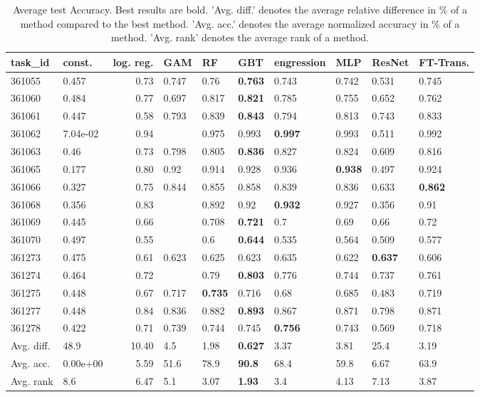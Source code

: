 \begin{table}[ht!]
\centering
\begingroup\footnotesize
\begin{tabular}{llrlllllll}
  \hline
\hline
task\_id & const. & log. reg. & GAM & RF & GBT & engression & MLP & ResNet & FT-Trans. \\ 
  \hline
361055 & 0.457 & 0.73 & 0.747 & 0.76 & \textbf{0.763} & 0.743 & 0.742 & 0.531 & 0.745 \\ 
  361060 & 0.484 & 0.77 & 0.697 & 0.817 & \textbf{0.821} & 0.785 & 0.755 & 0.652 & 0.762 \\ 
  361061 & 0.447 & 0.58 & 0.793 & 0.839 & \textbf{0.843} & 0.794 & 0.813 & 0.743 & 0.833 \\ 
  361062 & 7.04e-02 & 0.94 &  & 0.975 & 0.993 & \textbf{0.997} & 0.993 & 0.511 & 0.992 \\ 
  361063 & 0.46 & 0.73 & 0.798 & 0.805 & \textbf{0.836} & 0.827 & 0.824 & 0.609 & 0.816 \\ 
  361065 & 0.177 & 0.80 & 0.92 & 0.914 & 0.928 & 0.936 & \textbf{0.938} & 0.497 & 0.924 \\ 
  361066 & 0.327 & 0.75 & 0.844 & 0.855 & 0.858 & 0.839 & 0.836 & 0.633 & \textbf{0.862} \\ 
  361068 & 0.356 & 0.83 &  & 0.892 & 0.92 & \textbf{0.932} & 0.927 & 0.356 & 0.91 \\ 
  361069 & 0.445 & 0.66 &  & 0.708 & \textbf{0.721} & 0.7 & 0.69 & 0.66 & 0.72 \\ 
  361070 & 0.497 & 0.55 &  & 0.6 & \textbf{0.644} & 0.535 & 0.564 & 0.509 & 0.577 \\ 
  361273 & 0.475 & 0.61 & 0.623 & 0.625 & 0.623 & 0.635 & 0.622 & \textbf{0.637} & 0.606 \\ 
  361274 & 0.464 & 0.72 &  & 0.79 & \textbf{0.803} & 0.776 & 0.744 & 0.737 & 0.761 \\ 
  361275 & 0.448 & 0.67 & 0.717 & \textbf{0.735} & 0.716 & 0.68 & 0.685 & 0.483 & 0.719 \\ 
  361277 & 0.448 & 0.84 & 0.836 & 0.882 & \textbf{0.893} & 0.867 & 0.871 & 0.798 & 0.871 \\ 
  361278 & 0.422 & 0.71 & 0.739 & 0.744 & 0.745 & \textbf{0.756} & 0.743 & 0.569 & 0.718 \\ 
   \hline
Avg. diff. & 48.9 & 10.40 & 4.5 & 1.98 & \textbf{0.627} & 3.37 & 3.81 & 25.4 & 3.19 \\ 
  Avg. acc. & 0.00e+00 & 5.59 & 51.6 & 78.9 & \textbf{90.8} & 68.4 & 59.8 & 6.67 & 63.9 \\ 
  Avg. rank & 8.6 & 6.47 & 5.1 & 3.07 & \textbf{1.93} & 3.4 & 4.13 & 7.13 & 3.87 \\ 
   \hline
\hline
\end{tabular}
\endgroup
\caption{Average test Accuracy. 
                  Best results are bold. 
                  'Avg. diff.' denotes the average relative difference in \% of a method compared to the best method.
                  'Avg. acc.' denotes the average normalized accuracy in \% of a method.
                  'Avg. rank' denotes the average rank of a method.} 
\label{TABLES/table_results_Accuracy_mahalanobis}
\end{table}
